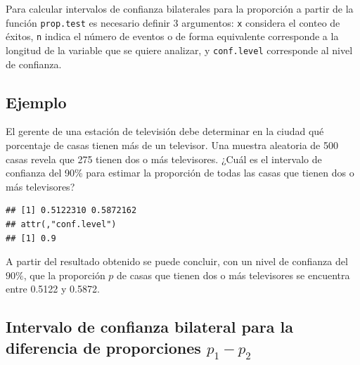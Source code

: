 \documentclass[
]{book}
\makeatletter
\newenvironment{Shaded}{\begin{snugshade}}{\end{snugshade}}
\newcommand{\AttributeTok}[1]{\textcolor[rgb]{0.77,0.63,0.00}{#1}}
\newcommand{\DecValTok}[1]{\textcolor[rgb]{0.00,0.00,0.81}{#1}}
\newcommand{\FloatTok}[1]{\textcolor[rgb]{0.00,0.00,0.81}{#1}}
\newcommand{\FunctionTok}[1]{\textcolor[rgb]{0.00,0.00,0.00}{#1}}
\newcommand{\NormalTok}[1]{#1}
\newcommand{\SpecialCharTok}[1]{\textcolor[rgb]{0.00,0.00,0.00}{#1}}
\newenvironment{kframe}{%
\medskip{}
\setlength{\fboxsep}{.8em}
 \def\at@end@of@kframe{}%
 \ifinner\ifhmode%
  \def\at@end@of@kframe{\end{minipage}}%
  \begin{minipage}{\columnwidth}%
 \fi\fi%
 \def\FrameCommand##1{\hskip\@totalleftmargin \hskip-\fboxsep
 \colorbox{shadecolor}{##1}\hskip-\fboxsep
     \hskip-\linewidth \hskip-\@totalleftmargin \hskip\columnwidth}%
 \MakeFramed {\advance\hsize-\width
   \@totalleftmargin\z@ \linewidth\hsize
   \@setminipage}}%
 {\par\unskip\endMakeFramed%
 \at@end@of@kframe}
\renewenvironment{Shaded}{\begin{kframe}}{\end{kframe}}
\makeatother
\begin{document}
Para calcular intervalos de confianza bilaterales para la proporción a partir de la función \texttt{prop.test} es necesario definir 3 argumentos: \texttt{x} considera el conteo de éxitos, \texttt{n} indica el número de eventos o de forma equivalente corresponde a la longitud de la variable que se quiere analizar, y \texttt{conf.level} corresponde al nivel de confianza.

\hypertarget{ejemplo-61}{%
\subsection*{Ejemplo}\label{ejemplo-61}}

El gerente de una estación de televisión debe determinar en la ciudad qué porcentaje de casas tienen más de un televisor. Una muestra aleatoria de 500 casas revela que 275 tienen dos o más televisores. ¿Cuál es el intervalo de confianza del 90\% para estimar la proporción de todas las casas que tienen dos o más televisores?

\begin{Shaded}
\end{Shaded}

\begin{verbatim}
## [1] 0.5122310 0.5872162
## attr(,"conf.level")
## [1] 0.9
\end{verbatim}

A partir del resultado obtenido se puede concluir, con un nivel de confianza del \(90\%\), que la proporción \(p\) de casas que tienen dos o más televisores se encuentra entre 0.5122 y 0.5872.

\hypertarget{intervalo-de-confianza-bilateral-para-la-diferencia-de-proporciones-p_1---p_2}{%
\subsection{\texorpdfstring{Intervalo de confianza bilateral para la diferencia de proporciones \(p_1 - p_2\)}{Intervalo de confianza bilateral para la diferencia de proporciones p\_1 - p\_2}}\label{intervalo-de-confianza-bilateral-para-la-diferencia-de-proporciones-p_1---p_2}}
\end{document}
